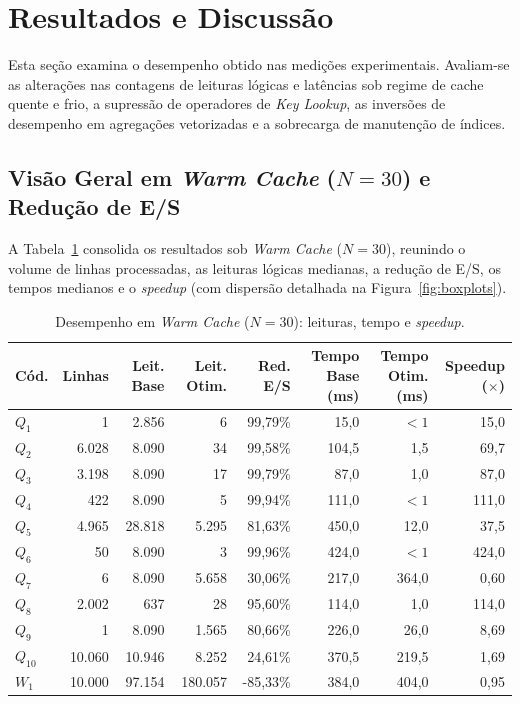 \documentclass[12pt]{article}
\begin{document}
\section{Resultados e Discussão}

Esta seção examina o desempenho obtido nas medições experimentais. Avaliam-se as alterações nas contagens de leituras lógicas e latências sob regime de cache quente e frio, a supressão de operadores de \textit{Key Lookup}, as inversões de desempenho em agregações vetorizadas e a sobrecarga de manutenção de índices.

\subsection{Visão Geral em \textit{Warm Cache} ($N=30$) e Redução de E/S}

A Tabela~\ref{tab:resultados-warm} consolida os resultados sob \textit{Warm Cache} ($N=30$), reunindo o volume de linhas processadas, as leituras lógicas medianas, a redução de E/S, os tempos medianos e o \textit{speedup} (com dispersão detalhada na Figura~\ref{fig:boxplots}).

\begin{table}[htbp]
\centering
\caption{Desempenho em \textit{Warm Cache} ($N=30$): leituras, tempo e \textit{speedup}.}
\label{tab:resultados-warm}
\scriptsize
\setlength{\tabcolsep}{4.5pt}
\begin{tabular}{@{}lrrrrrrr@{}}
\toprule
\textbf{Cód.} & \textbf{Linhas} & \textbf{Leit. Base} & \textbf{Leit. Otim.} & \textbf{Red. E/S} & \textbf{Tempo Base (ms)} & \textbf{Tempo Otim. (ms)} & \textbf{Speedup ($\times$)} \\
\midrule
$Q_1$ & 1 & 2.856 & 6 & 99,79\% & 15,0 & ${<}1$ & 15,0 \\
$Q_2$ & 6.028 & 8.090 & 34 & 99,58\% & 104,5 & 1,5 & 69,7 \\
$Q_3$ & 3.198 & 8.090 & 17 & 99,79\% & 87,0 & 1,0 & 87,0 \\
$Q_4$ & 422 & 8.090 & 5 & 99,94\% & 111,0 & ${<}1$ & 111,0 \\
$Q_5$ & 4.965 & 28.818 & 5.295 & 81,63\% & 450,0 & 12,0 & 37,5 \\
$Q_6$ & 50 & 8.090 & 3 & 99,96\% & 424,0 & ${<}1$ & 424,0 \\
$Q_7$ & 6 & 8.090 & 5.658 & 30,06\% & 217,0 & 364,0 & 0,60 \\
$Q_8$ & 2.002 & 637 & 28 & 95,60\% & 114,0 & 1,0 & 114,0 \\
$Q_9$ & 1 & 8.090 & 1.565 & 80,66\% & 226,0 & 26,0 & 8,69 \\
$Q_{10}$ & 10.060 & 10.946 & 8.252 & 24,61\% & 370,5 & 219,5 & 1,69 \\
\midrule
$W_1$ & 10.000 & 97.154 & 180.057 & -85,33\% & 384,0 & 404,0 & 0,95 \\
\bottomrule
\end{tabular}
\end{table}
\end{document}
